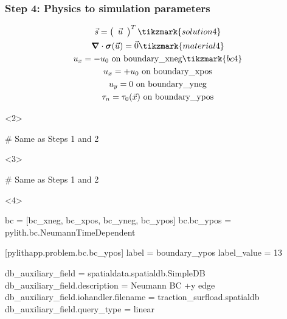 \documentclass[aspectratio=169]{beamer}
\begin{document}
\begin{frame}[t,fragile]
  \frametitle{Step 4: Physics to simulation parameters}
  \summary{}

  \begin{minipage}[t]{0.3\textwidth}
    {\scriptsize
    \begin{gather*}
        \vec{s} = \left(\begin{array}{c} \vec{u} \end{array}\right)^T \tikzmark{solution4}\\
        \tensor{\nabla} \cdot \tensor{\sigma}(\vec{u}) = \vec{0} \tikzmark{material4}\\
        u_x = -u_0 \text{ on boundary\_xneg} \tikzmark{bc4}\\
        u_x = +u_0 \text{ on boundary\_xpos} \\
        u_y = 0 \text{ on boundary\_yneg} \\
        \tau_n = \tau_0(\vec{x}) \text{ on boundary\_ypos}
    \end{gather*}}
  \end{minipage}
  \hfill
  \begin{minipage}[t]{0.67\textwidth}
    \begin{onlyenv}<2>
      \begin{cfgcode}
        # Same as Steps 1 and 2
      \end{cfgcode}
    \end{onlyenv}
    \begin{onlyenv}<3>
      \begin{cfgcode}
        # Same as Steps 1 and 2
      \end{cfgcode}
    \end{onlyenv}
    \begin{onlyenv}<4>
      \begin{cfgcode}
        bc = [bc_xneg, bc_xpos, bc_yneg, bc_ypos]
        bc.bc_ypos = pylith.bc.NeumannTimeDependent

        [pylithapp.problem.bc.bc_ypos]
        label = boundary_ypos
        label_value = 13

        db_auxiliary_field = spatialdata.spatialdb.SimpleDB
        db_auxiliary_field.description = Neumann BC +y edge
        db_auxiliary_field.iohandler.filename = traction_surfload.spatialdb
        db_auxiliary_field.query_type = linear


\end{cfgcode}
\end{onlyenv}
\end{minipage}
\end{frame}
\end{document}
